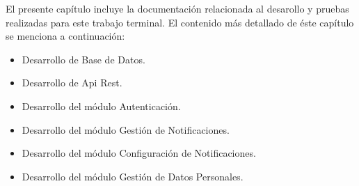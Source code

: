 El presente capítulo incluye la documentación relacionada al desarollo y pruebas realizadas para este trabajo terminal. El contenido más detallado de éste capítulo se menciona a continuación:

\begin{itemize}
	\item Desarrollo de Base de Datos.
	\item Desarrollo de Api Rest.
	\item Desarrollo del módulo Autenticación.
	\item Desarrollo del módulo Gestión de Notificaciones.
	\item Desarrollo del módulo Configuración de Notificaciones.
	\item Desarrollo del módulo Gestión de Datos Personales.
\end{itemize}

\newpage
{}
